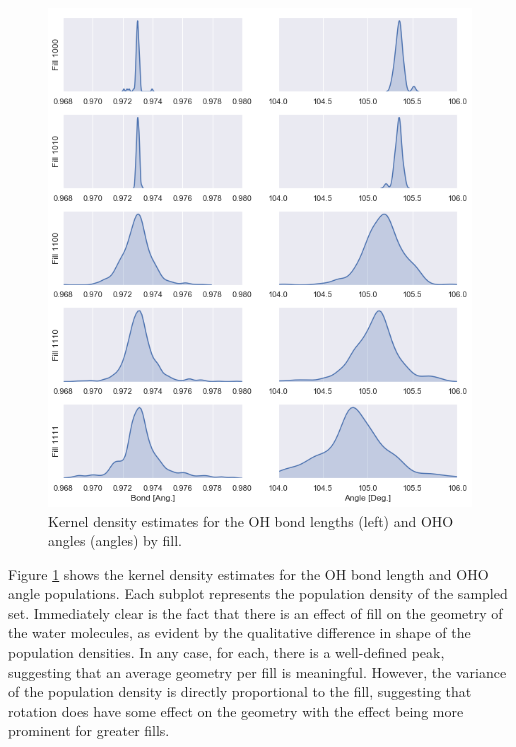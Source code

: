         \begin{figure}
            \centering
            \includegraphics[width=0.85\linewidth]{Figures/System/geom_kdes.png}
            \caption{Kernel density estimates for the OH bond lengths (left) and OHO angles (angles) by fill. }
            \label{fig:geom_kdes}
        \end{figure}
        
        Figure \ref{fig:geom_kdes} shows the kernel density estimates for the OH bond length and OHO angle populations. Each subplot represents the population density of the sampled set. Immediately clear is the fact that there is an effect of fill on the geometry of the water molecules, as evident by the qualitative difference in shape of the population densities. In any case, for each, there is a well-defined peak, suggesting that an average geometry per fill is meaningful. However, the variance of the population density is directly proportional to the fill, suggesting that rotation does have some effect on the geometry with the effect being more prominent for greater fills. 
        
        
        
